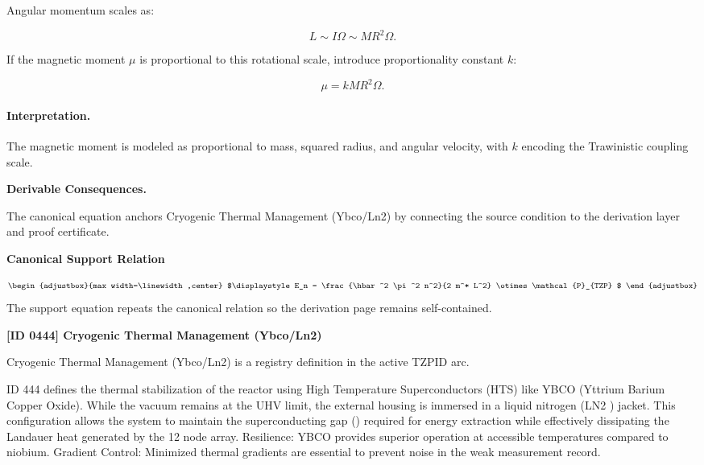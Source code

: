 Angular momentum scales as:

\begin{equation}
L
\sim
I\Omega
\sim
MR^2\Omega .
\end{equation}

If the magnetic moment $\mu$ is proportional to this rotational scale, introduce proportionality constant $k$:

\begin{equation}
\boxed{
\mu
=
kMR^2\Omega .
}
\end{equation}

\paragraph{Interpretation.}
The magnetic moment is modeled as proportional to mass, squared radius, and angular velocity, with $k$ encoding the Trawinistic coupling scale.

\par\vspace{0.35em}
\noindent\textbf{Derivable Consequences.}\quad
\begingroup
\footnotesize
\raggedright
The canonical equation anchors Cryogenic Thermal Management (Ybco/Ln2) by connecting the source condition to the derivation layer and proof certificate.
\par\endgroup

\noindent\textbf{Canonical Support Relation}\par
\[
\begin{adjustbox}{max width=\linewidth,center}
$\displaystyle
E_n = \frac{\hbar^2 \pi^2 n^2}{2 m^* L^2} \otimes \mathcal{P}_{TZP}
$
\end{adjustbox}
\]
\noindent The support equation repeats the canonical relation so the derivation page remains self-contained.\par

\clearpage
\noindent\textbf{[ID 0444] Cryogenic Thermal Management (Ybco/Ln2)}\par
\vspace{0.35em}
\begingroup\small
{}
Cryogenic Thermal Management (Ybco/Ln2) is a registry definition in the active TZPID arc.

ID 444 defines the thermal stabilization of the reactor using High Temperature Superconductors (HTS) like YBCO (Yttrium Barium Copper Oxide). While the vacuum remains at the UHV limit, the external housing is immersed in a liquid nitrogen (LN2 ) jacket. This configuration allows the system to maintain the superconducting gap () required for energy extraction while effectively dissipating the Landauer heat generated by the 12 node array. Resilience: YBCO provides superior operation at accessible temperatures compared to niobium. Gradient Control: Minimized thermal gradients are essential to prevent noise in the weak measurement record.

